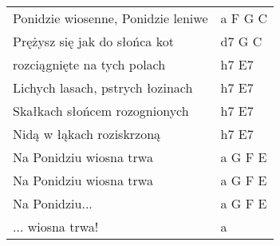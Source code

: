 \documentclass[a5paper]{article}
\begin{document}
\noindent
\begin{tabular}{@{}p{7.50cm}p{3cm}@{}}
Ponidzie wiosenne, Ponidzie leniwe & a F G C \\
Prężysz się jak do słońca kot & d7 G C\\
rozciągnięte na tych polach & h7 E7 \\
Lichych lasach, pstrych łozinach & h7 E7 \\
Skałkach słońcem rozognionych & h7 E7 \\
Nidą w łąkach roziskrzoną & h7 E7 \\
Na Ponidziu wiosna trwa & a G F E \\ 
Na Ponidziu wiosna trwa & a G F E \\ 
Na Ponidziu... & a G F E \\
... wiosna trwa! & a \\
\end{tabular}
\end{document}
